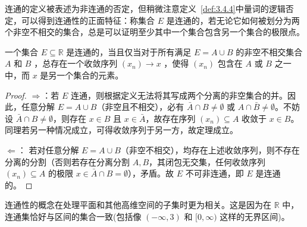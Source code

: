 连通的定义被表述为非连通的否定，但稍微注意定义~\ref{def:3.4.4}中量词的逻辑否定，可以得到连通性的正面特征：称集合 \(E\) 是连通的，若无论它如何被划分为两个非空不相交的集合，总是可以证明至少其中一个集合包含另一个集合的极限点。

\begin{Thm}
  \label{thm:3.4.6}
  一个集合 \(E \subseteq  \mathbb{R}\) 是连通的，当且仅当对于所有满足 \(E = A \cup  B\) 的非空不相交集合 \(A\) 和 \(B\) ，总存在一个收敛序列 \(\left( {x}_{n}\right)  \rightarrow  x\) ，使得 \(\left( {x}_{n}\right)\) 包含在 \(A\) 或 \(B\) 之一中，而 \(x\) 是另一个集合的元素。
\end{Thm}


\begin{proof}
$\Rightarrow$：若 \(E\) 连通，则根据定义无法将其写成两个分离的非空集合的并。因此，任意分解 \(E = A \cup B\)（非空且不相交），必有 \(\bar{A} \cap B \neq \emptyset\) 或 \(A \cap \bar{B} \neq \emptyset\)。不妨设 \(\bar{A} \cap B \neq \emptyset\)，则存在 \(x \in B\) 且 \(x \in \bar{A}\)，故存在序列 \((x_n) \subseteq A\) 收敛于 \(x \in B\)。同理若另一种情况成立，可得收敛序列于另一方，故定理成立。

$\Leftarrow$： 若对任意分解 \(E = A \cup B\)（非空不相交），均存在上述收敛序列，则不存在分离的分割（否则若存在分离分割 \(A,B\)，其闭包无交集，任何收敛序列 \((x_n) \subseteq A\) 的极限 \(x \in \bar{A} \cap B = \emptyset\)），矛盾。故 \(E\) 不可非连通，即 \(E\) 是连通的。
\end{proof}

连通性的概念在处理平面和其他高维空间的子集时更为相关。这是因为在 \(\mathbb{R}\) 中，连通集恰好与区间的集合一致(包括像 \(\left( {-\infty ,3}\right)\) 和 \(\lbrack 0,\infty )\) 这样的无界区间)。

